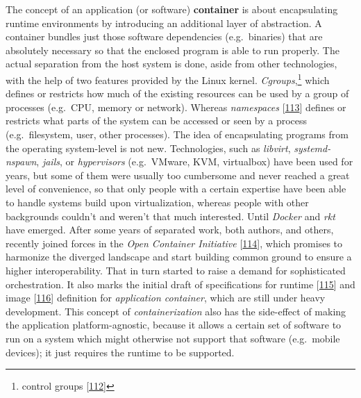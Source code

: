\documentclass[12pt,english,a4paper,titlepage,cleardoublepage=empty,dottedtoc]{report}
\begin{document}
The concept of an application (or software)
\textbf{\protect\hypertarget{def--container}{}{container}} is about
encapsulating runtime environments by introducing an additional layer of
abstraction. A container bundles just those software dependencies
(e.g.~binaries) that are absolutely necessary so that the enclosed
program is able to run properly. The actual separation from the host
system is done, aside from other technologies, with the help of two
features provided by the Linux kernel. \emph{Cgroups},\footnote{control
  groups {[}\protect\hyperlink{ref-web_2015_cgroup-doc}{112}{]}} which
defines or restricts how much of the existing resources can be used by a
group of processes (e.g.~CPU, memory or network). Whereas
\emph{namespaces}
{[}\protect\hyperlink{ref-web_2016_kernel-namespace}{113}{]} defines or
restricts what parts of the system can be accessed or seen by a process
(e.g.~filesystem, user, other processes). The idea of encapsulating
programs from the operating system-level is not new. Technologies, such
as \emph{libvirt}, \emph{systemd-nspawn}, \emph{jails}, or
\emph{hypervisors} (e.g.~VMware, KVM, virtualbox) have been used for
years, but some of them were usually too cumbersome and never reached a
great level of convenience, so that only people with a certain expertise
have been able to handle systems build upon virtualization, whereas
people with other backgrounds couldn't and weren't that much interested.
Until \emph{Docker} and \emph{rkt} have emerged. After some years of
separated work, both authors, and others, recently joined forces in the
\emph{Open Container Initiative}
{[}\protect\hyperlink{ref-web_2016_open-container-initiative}{114}{]},
which promises to harmonize the diverged landscape and start building
common ground to ensure a higher interoperability. That in turn started
to raise a demand for sophisticated orchestration. It also marks the
initial draft of specifications for runtime
{[}\protect\hyperlink{ref-web_oci-spec_runtime}{115}{]} and image
{[}\protect\hyperlink{ref-web_oci-spec_image}{116}{]} definition for
\emph{application container}, which are still under heavy development.
This concept of \emph{containerization} also has the side-effect of
making the application platform-agnostic, because it allows a certain
set of software to run on a system which might otherwise not support
that software (e.g.~mobile devices); it just requires the runtime to be
supported.
\end{document}
